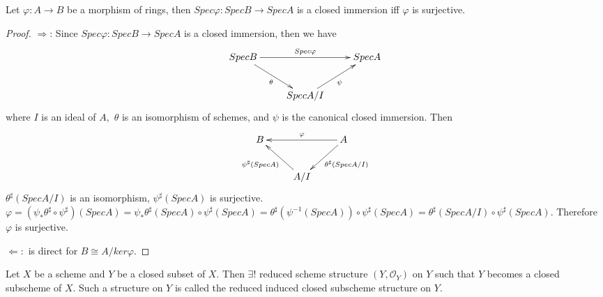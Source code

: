 \begin{cor}
Let $\varphi: A\rightarrow B$ be a morphism of rings, then
$Spec\varphi: SpecB \rightarrow SpecA$ is a closed immersion iff
$\varphi$ is surjective.
\end{cor}
\begin{proof}
$\Longrightarrow$: Since $Spec\varphi: SpecB \rightarrow SpecA$ is a
closed immersion, then we have
\[ \xymatrix{
   SpecB \ar"1,3"^-{Spec\varphi} \ar"2,2"_{\theta} & & SpecA\\
   &    SpecA/I \ar"1,3"_{\psi}   }  \]
where $I$ is an ideal of $A,$ $\theta$ is an isomorphism of schemes,
and $\psi$ is the canonical closed immersion. Then
\[ \xymatrix{
   B & & A \ar"1,1"_-{\varphi} \ar"2,2"^-{\theta^{\sharp}(SpecA/I)}\\
   &    A/I \ar"1,1"^-{\psi^{\sharp}(SpecA)}   }  \]
$\theta^{\sharp}(SpecA/I)$ is an isomorphism, $\psi^{\sharp}(SpecA)$
is surjective. $\varphi =
(\psi_{\ast}\theta^{\sharp}\circ\psi^{\sharp})(SpecA) =
\psi_{\ast}\theta^{\sharp}(SpecA)\circ\psi^{\sharp}(SpecA) =
\theta^{\sharp}(\psi^{-1}(SpecA))\circ\psi^{\sharp}(SpecA) =
\theta^{\sharp}(SpecA/I)\circ\psi^{\sharp}(SpecA).$ Therefore
$\varphi$ is surjective.

$\Longleftarrow:$ is direct for $B\cong A/ker\varphi.$
\end{proof}
\begin{prop}
Let $X$ be a scheme and $Y$ be a closed subset of $X.$ Then $\exists
!$ reduced scheme structure $(Y, \mathcal {O}_Y)$ on $Y$ such that
$Y$ becomes a closed subscheme of $X.$ Such a structure on $Y$ is
called the reduced induced closed subscheme structure on $Y.$
\end{prop}
